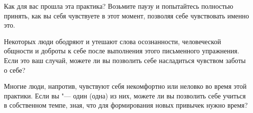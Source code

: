 \newpage


\vspace{3ex}

Как для вас прошла эта практика? Возьмите паузу и попытайтесь полностью принять, как вы себя чувствуете в этот момент, позволяя себе чувствовать именно это. 

Некоторых люди ободряют и утешают слова осознанности, человеческой общности и доброты к себе после выполнения этого письменного упражнения. Если это ваш случай, можете ли вы позволить себе насладиться чувством заботы о себе?

Многие люди, напротив, чувствуют себя некомфортно или неловко во время этой практики. Если вы "--- один (одна) из них, можете ли вы позволить себе учиться в собственном темпе, зная, что для формирования новых привычек нужно время?


